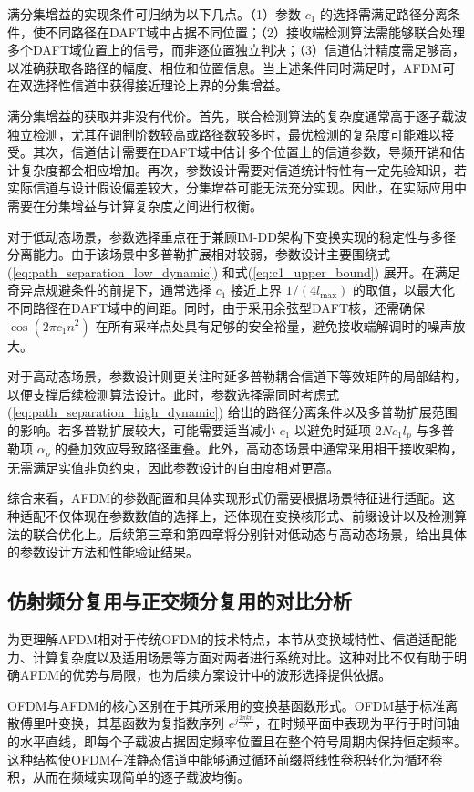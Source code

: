 满分集增益的实现条件可归纳为以下几点。（1）参数 $c_1$ 的选择需满足路径分离条件，使不同路径在DAFT域中占据不同位置；（2）接收端检测算法需能够联合处理多个DAFT域位置上的信号，而非逐位置独立判决；（3）信道估计精度需足够高，以准确获取各路径的幅度、相位和位置信息。当上述条件同时满足时，AFDM可在双选择性信道中获得接近理论上界的分集增益。

满分集增益的获取并非没有代价。首先，联合检测算法的复杂度通常高于逐子载波独立检测，尤其在调制阶数较高或路径数较多时，最优检测的复杂度可能难以接受。其次，信道估计需要在DAFT域中估计多个位置上的信道参数，导频开销和估计复杂度都会相应增加。再次，参数设计需要对信道统计特性有一定先验知识，若实际信道与设计假设偏差较大，分集增益可能无法充分实现。因此，在实际应用中需要在分集增益与计算复杂度之间进行权衡。


对于低动态场景，参数选择重点在于兼顾IM-DD架构下变换实现的稳定性与多径分离能力。由于该场景中多普勒扩展相对较弱，参数设计主要围绕式(\ref{eq:path_separation_low_dynamic}) 和式(\ref{eq:c1_upper_bound}) 展开。在满足奇异点规避条件的前提下，通常选择 $c_1$ 接近上界 $1/(4l_{\max})$ 的取值，以最大化不同路径在DAFT域中的间距。同时，由于采用余弦型DAFT核，还需确保 $\cos(2\pi c_1 n^2)$ 在所有采样点处具有足够的安全裕量，避免接收端解调时的噪声放大。

对于高动态场景，参数设计则更关注时延多普勒耦合信道下等效矩阵的局部结构，以便支撑后续检测算法设计。此时，参数选择需同时考虑式(\ref{eq:path_separation_high_dynamic}) 给出的路径分离条件以及多普勒扩展范围的影响。若多普勒扩展较大，可能需要适当减小 $c_1$ 以避免时延项 $2Nc_1 l_p$ 与多普勒项 $\alpha_p$ 的叠加效应导致路径重叠。此外，高动态场景中通常采用相干接收架构，无需满足实值非负约束，因此参数设计的自由度相对更高。

综合来看，AFDM的参数配置和具体实现形式仍需要根据场景特征进行适配。这种适配不仅体现在参数数值的选择上，还体现在变换核形式、前缀设计以及检测算法的联合优化上。后续第三章和第四章将分别针对低动态与高动态场景，给出具体的参数设计方法和性能验证结果。



\subsection{仿射频分复用与正交频分复用的对比分析}
\label{subsec:afdm_ofdm_comparison}

为更理解AFDM相对于传统OFDM的技术特点，本节从变换域特性、信道适配能力、计算复杂度以及适用场景等方面对两者进行系统对比。这种对比不仅有助于明确AFDM的优势与局限，也为后续方案设计中的波形选择提供依据。


OFDM与AFDM的核心区别在于其所采用的变换基函数形式。OFDM基于标准离散傅里叶变换，其基函数为复指数序列 $e^{j\frac{2\pi kn}{N}}$，在时频平面中表现为平行于时间轴的水平直线，即每个子载波占据固定频率位置且在整个符号周期内保持恒定频率。这种结构使OFDM在准静态信道中能够通过循环前缀将线性卷积转化为循环卷积，从而在频域实现简单的逐子载波均衡。

